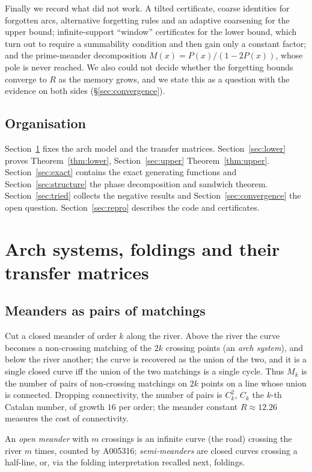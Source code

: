 \documentclass[11pt]{amsart}
\theoremstyle{definition}
\begin{document}
Finally we record what did not work. A tilted certificate, coarse identities for forgotten arcs, alternative forgetting rules and an adaptive coarsening for the upper bound; infinite-support ``window'' certificates for the lower bound, which turn out to require a summability condition and then gain only a constant factor; and the prime-meander decomposition $M(x)=P(x)/(1-2P(x))$, whose pole is never reached. We also could not decide whether the forgetting bounds converge to $R$ as the memory grows, and we state this as a question with the evidence on both sides (\S\ref{sec:convergence}).

\subsection*{Organisation} Section~\ref{sec:prelim} fixes the arch model and the transfer matrices. Section~\ref{sec:lower} proves Theorem~\ref{thm:lower}, Section~\ref{sec:upper} Theorem~\ref{thm:upper}. Section~\ref{sec:exact} contains the exact generating functions and Section~\ref{sec:structure} the phase decomposition and sandwich theorem. Section~\ref{sec:tried} collects the negative results and Section~\ref{sec:convergence} the open question. Section~\ref{sec:repro} describes the code and certificates.

\section{Arch systems, foldings and their transfer matrices}\label{sec:prelim}

\subsection{Meanders as pairs of matchings}
Cut a closed meander of order $k$ along the river. Above the river the curve becomes a non-crossing matching of the $2k$ crossing points (an \emph{arch system}), and below the river another; the curve is recovered as the union of the two, and it is a single closed curve iff the union of the two matchings is a single cycle. Thus $M_k$ is the number of pairs of non-crossing matchings on $2k$ points on a line whose union is connected. Dropping connectivity, the number of pairs is $C_k^2$, $C_k$ the $k$-th Catalan number, of growth $16$ per order; the meander constant $R\approx12.26$ measures the cost of connectivity.

An \emph{open meander} with $m$ crossings is an infinite curve (the road) crossing the river $m$ times, counted by A005316; \emph{semi-meanders} are closed curves crossing a half-line, or, via the folding interpretation recalled next, foldings.
\end{document}
